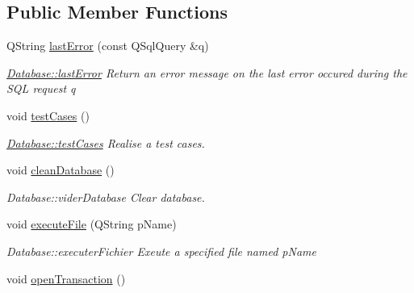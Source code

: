 \subsection*{Public Member Functions}
\begin{DoxyCompactItemize}
\item 
Q\-String \hyperlink{classDatabases_1_1Database_abda5b1dd4c55bee049e9450a40a7baab}{last\-Error} (const Q\-Sql\-Query \&q)
\begin{DoxyCompactList}\small\item\em \hyperlink{classDatabases_1_1Database_abda5b1dd4c55bee049e9450a40a7baab}{Database\-::last\-Error} Return an error message on the last error occured during the S\-Q\-L request {\itshape q} \end{DoxyCompactList}\item 
\hypertarget{classDatabases_1_1Database_a5029595698d889af5089428071c6ecda}{void \hyperlink{classDatabases_1_1Database_a5029595698d889af5089428071c6ecda}{test\-Cases} ()}\label{classDatabases_1_1Database_a5029595698d889af5089428071c6ecda}

\begin{DoxyCompactList}\small\item\em \hyperlink{classDatabases_1_1Database_a5029595698d889af5089428071c6ecda}{Database\-::test\-Cases} Realise a test cases. \end{DoxyCompactList}\item 
\hypertarget{classDatabases_1_1Database_a52c30975504e35c7c475a52817d66b73}{void \hyperlink{classDatabases_1_1Database_a52c30975504e35c7c475a52817d66b73}{clean\-Database} ()}\label{classDatabases_1_1Database_a52c30975504e35c7c475a52817d66b73}

\begin{DoxyCompactList}\small\item\em Database\-::vider\-Database Clear database. \end{DoxyCompactList}\item 
void \hyperlink{classDatabases_1_1Database_a21f6c86f95b149ac7dbf0ffc94021a93}{execute\-File} (Q\-String p\-Name)
\begin{DoxyCompactList}\small\item\em Database\-::executer\-Fichier Exeute a specified file named {\itshape p\-Name} \end{DoxyCompactList}\item 
\hypertarget{classDatabases_1_1Database_a64d55cd9452bbf2a6fd1693df004de59}{void \hyperlink{classDatabases_1_1Database_a64d55cd9452bbf2a6fd1693df004de59}{open\-Transaction} ()}\label{classDatabases_1_1Database_a64d55cd9452bbf2a6fd1693df004de59}


\end{DoxyCompactItemize}
